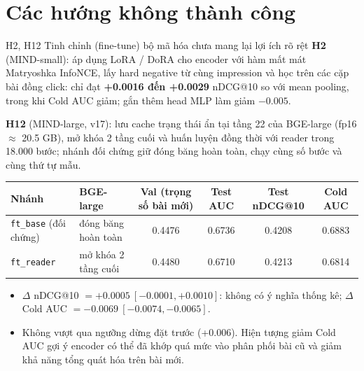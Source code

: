 \documentclass[aspectratio=169,t]{beamer}
\newcommand{\code}[1]{\texttt{#1}}
\begin{document}
\section{Các hướng không thành công}
\begin{frame}[shrink]{H2, H12 \textperiodcentered{} Tinh chỉnh (fine-tune) bộ mã hóa chưa mang lại lợi ích rõ rệt}
\scriptsize
\textbf{H2} (MIND-small): áp dụng LoRA / DoRA cho encoder với hàm mất mát Matryoshka InfoNCE, lấy hard negative từ cùng impression và học trên các cặp bài đồng click:
chỉ đạt \textbf{+0.0016 đến +0.0029} nDCG@10 so với mean pooling, trong khi Cold AUC giảm; gắn thêm head MLP làm giảm $-0.005$.\par\vspace{3pt}
\textbf{H12} (MIND-large, v17): lưu cache trạng thái ẩn tại tầng 22 của BGE-large (fp16 $\approx$ 20.5 GB), mở khóa 2 tầng cuối và huấn luyện đồng thời với reader trong 18.000 bước;
nhánh đối chứng giữ đóng băng hoàn toàn, chạy cùng số bước và cùng thứ tự mẫu.\par\vspace{3pt}
\renewcommand{\arraystretch}{1.07}
\begin{tabularx}{\textwidth}{@{}lYcccc@{}}
\toprule
\textbf{Nhánh} & \textbf{BGE-large} & \textbf{Val (trọng số bài mới)} & \textbf{Test AUC} & \textbf{Test nDCG@10} & \textbf{Cold AUC}\\
\midrule
\code{ft\_base} (đối chứng) & đóng băng hoàn toàn & 0.4476 & 0.6736 & 0.4208 & 0.6883\\
\code{ft\_reader} & mở khóa 2 tầng cuối & 0.4480 & 0.6710 & 0.4213 & 0.6814\\
\bottomrule
\end{tabularx}
\begin{itemize}
  \setlength{\itemsep}{1pt}
  \item $\Delta$ nDCG@10 $=+0.0005\ [-0.0001, +0.0010]$: không có ý nghĩa thống kê; $\Delta$ Cold AUC $=-0.0069\ [-0.0074, -0.0065]$.
  \item Không vượt qua ngưỡng dừng đặt trước (+0.006). Hiện tượng giảm Cold AUC gợi ý encoder có thể đã khớp quá mức vào phân phối bài cũ và giảm khả năng tổng quát hóa trên bài mới.
\end{itemize}
\par\kern0pt%
\end{frame}
\end{document}
